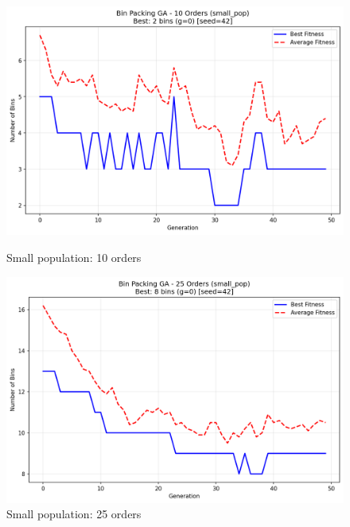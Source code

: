 \documentclass[journal,12pt,onecolumn]{IEEEtran}
\begin{document}
\begin{figure}[htbp]
\begin{minipage}{0.48\textwidth}
    \centering
    \includegraphics[width=\textwidth]{bpp_10items_small_pop_seed42.png}
    \caption{Small population: 10 orders}
    \label{fig:small_pop_10}
\end{minipage}\hfill
\begin{minipage}{0.48\textwidth}
    \centering
    \includegraphics[width=\textwidth]{bpp_25items_small_pop_seed42.png}
    \caption{Small population: 25 orders}
    \label{fig:small_pop_25}
\end{minipage}
\end{figure}
\end{document}
